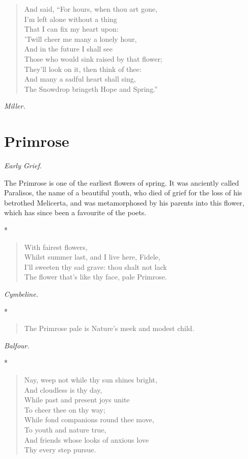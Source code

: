 \documentclass[11pt,twoside]{article}
\newcommand\flower[2]{\section*{#1}\addcontentsline{toc}{section}{#1}%
  \noindent\textit{#2.}\par\medskip}
\newcommand\stars{\begin{center}*\quad*\quad*\end{center}}
\newcommand\by[1]{\par\hfill\textit{#1}\par}
\begin{document}
\begin{verse}
\quad And said, “For hours, when thou art gone,\\
I’m left alone without a thing\\
\quad That I can fix my heart upon:\\
’Twill cheer me many a lonely hour,\\
\quad And in the future I shall see\\
Those who would sink raised by that flower;\\
\quad They’ll look on it, then think of thee:\\
And many a sadful heart shall sing,\\
The Snowdrop bringeth Hope and Spring.”
\end{verse}

\by{Miller.}

\flower{Primrose}{Early Grief}

The Primrose is one of the earliest flowers of spring. It was anciently called Paralisos, the name of a beautiful youth, who died of grief for the loss of his betrothed Melicerta, and was metamorphosed by his parents into this flower, which has since been a favourite of the poets.

\stars

\begin{verse}
\quad With fairest flowers,\\
Whilst summer last, and I live here, Fidele,\\
I’ll sweeten thy sad grave: thou shalt not lack\\
The flower that’s like thy face, pale Primrose.
\end{verse}

\by{Cymbeline.}

\stars

\begin{verse}
The Primrose pale is Nature’s meek and modest child.
\end{verse}

\by{Balfour.}

\stars

\begin{verse}
Nay, weep not while thy sun shines bright,\\
\quad And cloudless is thy day,\\
While past and present joys unite\\
\quad To cheer thee on thy way;\\
While fond companions round thee move,\\
\quad To youth and nature true,\\
And friends whose looks of anxious love\\
\quad Thy every step pursue.
\end{verse}
\end{document}
